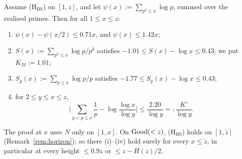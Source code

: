 \begin{lemma}\label{lem:cm}
Assume \textup{(H$_{\mathrm{BS}}$)} on $[1,z]$, and let $\psi(x):=\sum_{p^k\le x}\log p$, summed over the realised
primes. Then for all $1\le x\le z$:
\begin{enumerate}[label=\textup{(\roman*)}]
\item $\psi(x)-\psi(x/2)\le 0.71x$, and $\psi(x)\le 1.42x$;
\item $S(x):=\sum_{p^k\le x}\log p/p^k$ satisfies $-1.01\le S(x)-\log x\le 0.43$; we put $K_M:=1.01$;
\item $S_p(x):=\sum_{p\le x}\log p/p$ satisfies $-1.77\le S_p(x)-\log x\le 0.43$;
\item for $2\le y\le x\le z$,
  \[
    \Big|\sum_{y<p\le x}\frac1p-\log\frac{\log x}{\log y}\Big|\le\frac{2.20}{\log y}=:\frac{K'}{\log y}.
  \]
\end{enumerate}
The proof at $x$ uses $N$ only on $[1,x]$. On $\mathrm{Good}(<z)$, \textup{(H$_{\mathrm{BS}}$)} holds on $[1,\check z]$
(Remark~\ref{rem:horizon}); so there \textup{(i)--(iv)} hold surely for every $x\le\check z$, in particular at every height
$\le0.9z$ or $\le z-H(z)/2$.
\end{lemma}

